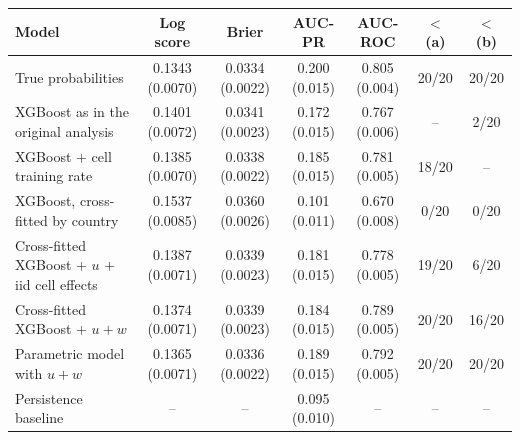 \begin{tabular}{@{}lcccccc@{}}
\toprule
Model & Log score & Brier & AUC-PR & AUC-ROC & $<$ (a) & $<$ (b) \\
\midrule
True probabilities & 0.1343 (0.0070) & 0.0334 (0.0022) & 0.200 (0.015) & 0.805 (0.004) & 20/20 & 20/20 \\
XGBoost as in the original analysis & 0.1401 (0.0072) & 0.0341 (0.0023) & 0.172 (0.015) & 0.767 (0.006) & -- & 2/20 \\
XGBoost + cell training rate & 0.1385 (0.0070) & 0.0338 (0.0022) & 0.185 (0.015) & 0.781 (0.005) & 18/20 & -- \\
XGBoost, cross-fitted by country & 0.1537 (0.0085) & 0.0360 (0.0026) & 0.101 (0.011) & 0.670 (0.008) & 0/20 & 0/20 \\
Cross-fitted XGBoost + $u$ + iid cell effects & 0.1387 (0.0071) & 0.0339 (0.0023) & 0.181 (0.015) & 0.778 (0.005) & 19/20 & 6/20 \\
Cross-fitted XGBoost + $u + w$ & 0.1374 (0.0071) & 0.0339 (0.0023) & 0.184 (0.015) & 0.789 (0.005) & 20/20 & 16/20 \\
Parametric model with $u + w$ & 0.1365 (0.0071) & 0.0336 (0.0022) & 0.189 (0.015) & 0.792 (0.005) & 20/20 & 20/20 \\
Persistence baseline & -- & -- & 0.095 (0.010) & -- & -- & -- \\
\bottomrule
\end{tabular}
